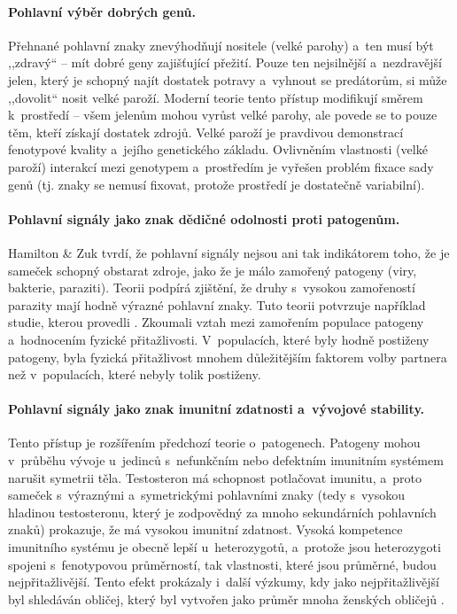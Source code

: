 \documentclass[a4paper, 12pt, notitlepage, oneside, numbers=noenddot]{report}
\begin{document}
\paragraph{Pohlavní výběr dobrých genů.}
Přehnané pohlavní znaky znevýhodňují nositele (velké parohy) a~ten
musí být ,,zdravý`` -- mít dobré geny zajišťující přežití.  Pouze ten
nejsilnější a~nezdravější jelen, který je schopný najít dostatek
potravy a~vyhnout se predátorům, si může ,,dovolit`` nosit velké
paroží.  Moderní teorie tento přístup modifikují směrem k~prostředí --
všem jelenům mohou vyrůst velké parohy, ale povede se to pouze těm,
kteří získají dostatek zdrojů.  Velké paroží je pravdivou demonstrací
fenotypové kvality a~jejího genetického základu. Ovlivněním vlastnosti
(velké paroží) interakcí mezi genotypem a~prostředím je vyřešen
problém fixace sady genů (tj. znaky se nemusí fixovat, protože
prostředí je dostatečně variabilní).

\paragraph{Pohlavní signály jako znak dědičné odolnosti proti
  patogenům.}
Hamilton \& Zuk tvrdí, že pohlavní signály nejsou ani tak indikátorem
toho, že je sameček schopný obstarat zdroje, jako že je málo zamořený
patogeny (viry, bakterie, paraziti). Teorii podpírá zjištění, že druhy
s~vysokou zamořeností parazity mají hodně výrazné pohlavní znaky.
Tuto teorii potvrzuje například studie, kterou provedli
\citet{GangestadBuss1993}.  Zkoumali vztah mezi zamořením populace
patogeny a~hodnocením fyzické přitažlivosti.  V~populacích, které byly
hodně postiženy patogeny, byla fyzická přitažlivost mnohem
důležitějším faktorem volby partnera než v~populacích, které nebyly
tolik postiženy.

\paragraph{Pohlavní signály jako znak imunitní zdatnosti a~vývojové
  stability.}
Tento přístup je rozšířením předchozí teorie o~patogenech. Patogeny
mohou v~průběhu vývoje u~jedinců s~nefunkčním nebo defektním imunitním
systémem narušit symetrii těla. Testosteron má schopnost potlačovat
imunitu, a~proto sameček s~výraznými a~symetrickými pohlavními znaky
(tedy s~vysokou hladinou testosteronu, který je zodpovědný za mnoho
sekundárních pohlavních znaků) prokazuje, že má vysokou imunitní
zdatnost.  Vysoká kompetence imunitního systému je obecně lepší
u~heterozygotů, a~protože jsou heterozygoti spojeni s~fenotypovou
průměrností, tak vlastnosti, které jsou průměrné, budou
nejpřitažlivější.  Tento efekt prokázaly i~další výzkumy, kdy jako
nejpřitažlivější byl shledáván obličej, který byl vytvořen jako průměr
mnoha ženských obličejů \citep{Ridley2007}.
\end{document}
